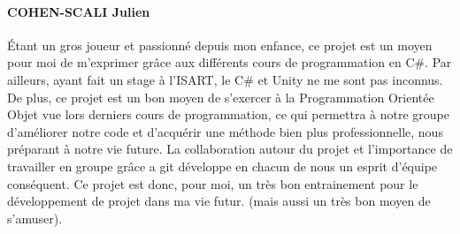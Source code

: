     \paragraph{COHEN-SCALI Julien}
    Étant un gros joueur et passionné depuis mon enfance, ce projet est un moyen pour moi de m’exprimer grâce aux différents cours de programmation en C\#.
    Par ailleurs, ayant fait un stage à l’ISART, le C\# et Unity ne me sont pas inconnus. De plus, ce projet est un bon moyen de s’exercer à la Programmation Orientée Objet vue lors derniers cours de programmation,
    ce qui permettra à notre groupe d’améliorer notre code et d’acquérir une méthode bien plus professionnelle, nous préparant à notre vie future.
    La collaboration autour du projet et l’importance de travailler en groupe grâce a git développe en chacun de nous un esprit d’équipe conséquent.
    Ce projet est donc, pour moi, un très bon entrainement pour le développement de projet dans ma vie futur. (mais aussi un très bon moyen de s’amuser).
    \vspace{0.5cm}